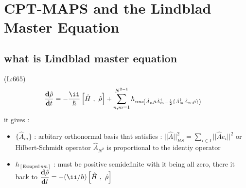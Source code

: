 \section{ CPT-MAPS and the Lindblad Master Equation }
\subsection{what is Lindblad master equation}
(L:665)
\begin{equation}
\begin{split}
\dfrac{\bold{d}\hat{\rho }}{\bold{d}t }&=-\frac{\ii }{\hbar }\left[\hat{H }\ ,\ \hat{\rho }\right]+\sum _{n ,m =1}^{N ^{2-1}}h _{n m \left(\hat{A }_{n }\hat{\rho }\hat{A }_{m }^\dagger -\frac{1}{2}\{\hat{A }_{m }^\dagger \hat{A }_{n },\hat{\rho }\}\right)}\end{split}
\end{equation}
 it gives : 
\begin{itemize}
\item
 $ \{\hat{A }_{m }\} $  : arbitary orthonormal basis 
 that satisfies :
 $ ||\hat{A }||_{H S }^{2}=\sum _{i \in I }||\hat{A }e _{i }||^{2} $  or Hilbert-Schmidt operator
 $ \hat{A }_{N ^{2}} $  is proportional to the identiy operator
\item
 $ h _{[\text{Escaped}\ nm]} $ : must be positive semidefinite 
 with it being all zero, there it back to 
 $ \dfrac{\bold{d}\hat{\rho }}{\bold{d}t }=-(\ii /\hbar )\left[\hat{H }\ ,\ \hat{\rho }\right] $ \end{itemize}
